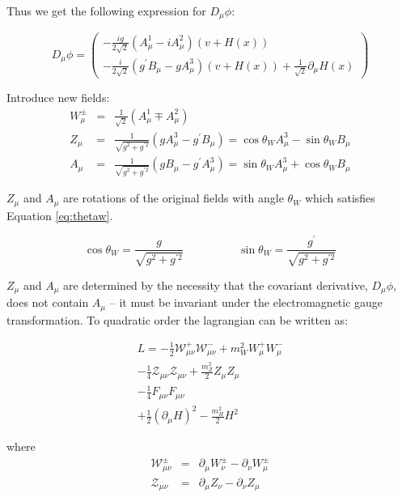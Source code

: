 Thus we get the following expression for $D_{\mu}\phi$:

\begin{equation}
D_{\mu}\phi = \left(
\begin{array}{c}
-\frac{ig}{2\sqrt{2}}\left(A_{\mu}^{1} - iA_{\mu}^{2}\right)(v + H(x)) \\
-\frac{i}{2\sqrt{2}}\left(g^{\prime}B_{\mu} - gA_{\mu}^{3}\right)(v + H(x)) +
\frac{1}{\sqrt{2}}\partial_{\mu}H(x)
\end{array}
\right)
\end{equation}

Introduce new fields:
\begin{eqnarray}
W_{\mu}^{\pm} &=& \frac{1}{\sqrt{2}}(A_{\mu}^{1} \mp A_{\mu}^{2}) \\
Z_{\mu} &=& \frac{1}{\sqrt{g^{2} + g^{\prime 2}}}(gA_{\mu}^{3} -
g^{\prime}B_{\mu}) = \cos\theta_{W}A_{\mu}^{3} - \sin\theta_{W}B_{\mu} \\
A_{\mu} &=& \frac{1}{\sqrt{g^{2} + g^{\prime 2}}}(gB_{\mu} -
g^{\prime}A_{\mu}^{3}) = \sin\theta_{W}A_{\mu}^{3} + \cos\theta_{W}B_{\mu}
\end{eqnarray}

$Z_{\mu}$ and $A_{\mu}$ are rotations of the original fields with angle
$\theta_{W}$ which satisfies Equation \ref{eq:thetaw}.

\begin{equation}
\cos\theta_{W} = \frac{g}{\sqrt{g^{2} + g^{\prime 2}}} \hspace{2cm}
\sin\theta_{W} = \frac{g^{\prime}}{\sqrt{g^{2} + g^{\prime 2}}}
\label{eq:thetaw}
\end{equation}

$Z_{\mu}$ and $A_{\mu}$ are determined by the necessity that the covariant
derivative, $D_{\mu}\phi$, does not contain $A_{\mu}$ -- it must be invariant
under the electromagnetic gauge transformation. To quadratic order the
lagrangian can be written as:  

\begin{eqnarray}
L = -\frac{1}{2}\mathcal{W}_{\mu\nu}^{+}\mathcal{W}_{\mu\nu}^{-} + 
m_{W}^{2}W_{\mu}^{+}W_{\mu}^{-} \\
-\frac{1}{4}\mathcal{Z}_{\mu\nu}\mathcal{Z}_{\mu\nu} + 
\frac{m_{Z}^{2}}{2}Z_{\mu}Z_{\mu} \\
-\frac{1}{4}F_{\mu\nu}F_{\mu\nu} \\
+\frac{1}{2}(\partial_{\mu}H)^{2} - \frac{m_{H}^{2}}{2}H^{2}
\end{eqnarray}

where
\begin{eqnarray}
\mathcal{W}_{\mu\nu}^{\pm} &=& \partial_{\mu}W_{\nu}^{\pm} -
\partial_{\nu}W_{\mu}^{\pm} \\
\mathcal{Z}_{\mu\nu} &=& \partial_{\mu}Z_{\nu} - \partial_{\nu}Z_{\mu}
\end{eqnarray}

